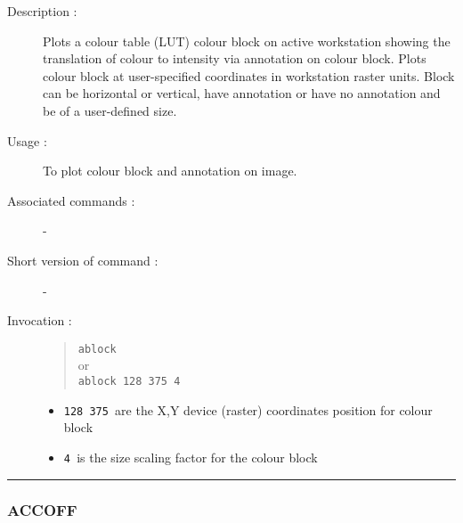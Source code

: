 \begin{description}

\item[Description :] Plots a colour table (LUT) colour block on active
workstation showing the translation of colour to intensity via annotation
on colour block.  Plots colour block at user-specified coordinates in
workstation raster units.  Block can be horizontal or vertical, have
annotation or have no annotation and be of a user-defined size. 

\item[Usage :] To plot colour block and annotation on image.
\item[Associated commands :] -
\item[Short version of command :] -
\item[Invocation :]

\begin{quote}{\tt ablock} \\
or \\
{\tt ablock 128 375 4 }
\end{quote}

\begin{itemize}

\item {\tt 128 375 }\/are the X,Y device (raster) coordinates position
for colour block

\item {\tt 4 }\/is the size scaling factor for the colour block

\end{itemize}

\end{description}

\hrule 
\subsubsection*{\label{ACCOFF}ACCOFF}

